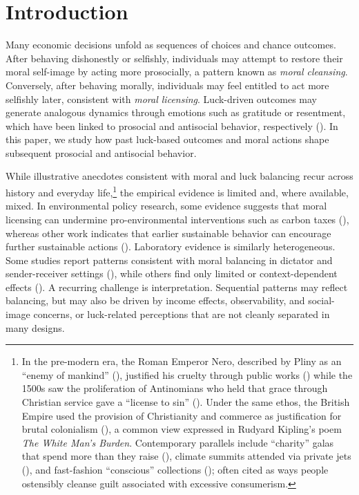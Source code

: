 \documentclass{article}
\begin{document}
\section{Introduction}

Many economic decisions unfold as sequences of choices and chance outcomes. After behaving dishonestly or selfishly, individuals may attempt to restore their moral self-image by acting more prosocially, a pattern known as \textit{moral cleansing}. Conversely, after behaving morally, individuals may feel entitled to act more selfishly later, consistent with \textit{moral licensing}. Luck-driven outcomes may generate analogous dynamics through emotions such as gratitude or resentment, which have been linked to prosocial and antisocial behavior, respectively (\cite{Baumeister2005,Bartlett2006}). In this paper, we study how past luck-based outcomes and moral actions shape subsequent prosocial and antisocial behavior.
\par
While illustrative anecdotes consistent with moral and luck balancing recur across history and everyday life,\footnote{In the pre-modern era, the Roman Emperor Nero, described by Pliny as an ``enemy of mankind'' (\cite{Gwyn1991}), justified his cruelty through public works (\cite{William2004}) while the 1500s saw the proliferation of Antinomians who held that grace through Christian service gave a ``license to sin'' (\cite{Graebner1899}). Under the same ethos, the British Empire used the provision of Christianity and commerce as justification for brutal colonialism (\cite{Carter2004}), a common view expressed in Rudyard Kipling’s poem \textit{The White Man’s Burden}. Contemporary parallels include ``charity'' galas that spend more than they raise (\cite{Hackney2017}), climate summits attended via private jets (\cite{Williams2021}), and fast-fashion ``conscious'' collections (\cite{Goil2022}); often cited as ways people ostensibly cleanse guilt associated with excessive consumerism.} the empirical evidence is limited and, where available, mixed. In environmental policy research, some evidence suggests that moral licensing can undermine pro-environmental interventions such as carbon taxes (\cite{Pizzo2024}), whereas other work indicates that earlier sustainable behavior can encourage further sustainable actions (\cite{Panzone2021}). Laboratory evidence is similarly heterogeneous. Some studies report patterns consistent with moral balancing in dictator and sender-receiver settings (\cite{BranasGarza2013,Gneezy2014}), while others find only limited or context-dependent effects (\cite{Gneezy2012,Ploner2013}). A recurring challenge is interpretation. Sequential patterns may reflect balancing, but may also be driven by income effects, observability, and social-image concerns, or luck-related perceptions that are not cleanly separated in many designs. 
\end{document}
